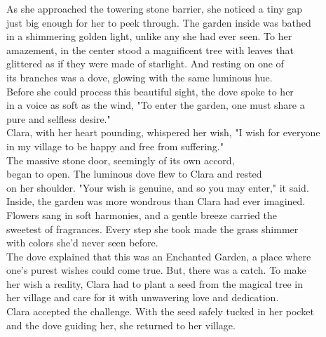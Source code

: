 \documentclass[12pt, a4paper, titlepage]{article}
\begin{document}
As she approached the towering stone barrier, she noticed a tiny gap\\
just big enough for her to peek through. The garden inside was bathed\\ 
in a shimmering golden light, unlike any she had ever seen. To her\\ 
amazement, in the center stood a magnificent tree with leaves that\\
glittered as if they were made of starlight. And resting on one of \\
its branches was a dove, glowing with the same luminous hue.\\


Before she could process this beautiful sight, the dove spoke to her\\
in a voice as soft as the wind, "To enter the garden, one must share a\\
pure and selfless desire."\\


Clara, with her heart pounding, whispered her wish, "I wish for everyone\\
in my village to be happy and free from suffering."\\


The massive stone door, seemingly of its own accord,\\
began to open. The luminous dove flew to Clara and rested\\
on her shoulder. "Your wish is genuine, and so you may enter," it said.\\


Inside, the garden was more wondrous than Clara had ever imagined.\\
Flowers sang in soft harmonies, and a gentle breeze carried the\\
sweetest of fragrances. Every step she took made the grass shimmer\\
with colors she'd never seen before.\\


The dove explained that this was an Enchanted Garden, a place where\\
one’s purest wishes could come true. But, there was a catch. To make\\
her wish a reality, Clara had to plant a seed from the magical tree in\\
her village and care for it with unwavering love and dedication.\\


Clara accepted the challenge. With the seed safely tucked in her pocket\\
and the dove guiding her, she returned to her village.\\
\end{document}

